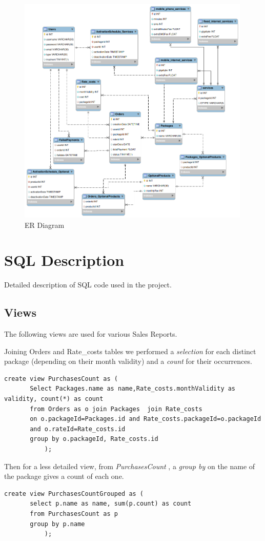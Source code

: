 \documentclass{article}
\begin{document}
\begin{figure}[hbt!]
\centering
\includegraphics[width=0.99\textwidth]{er2.png}
\caption{ER Diagram}
\end{figure}

\newpage
\section{SQL Description}

Detailed description of SQL code used in the project.
\subsection{Views}
\label{views}
The following views are used for various Sales Reports.



Joining Orders and Rate_costs tables we performed a \emph{selection} for each distinct package (depending on their month validity) and a \emph{count} for their occurrences.
\begin{lstlisting}
create view PurchasesCount as (
       Select Packages.name as name,Rate_costs.monthValidity as validity, count(*) as count
       from Orders as o join Packages  join Rate_costs
       on o.packageId=Packages.id and Rate_costs.packageId=o.packageId 
       and o.rateId=Rate_costs.id
       group by o.packageId, Rate_costs.id
           );
\end{lstlisting}
Then for a less detailed view, from \emph{PurchasesCount} , a \emph{group by} on the name of the package gives a count of each one.
\begin{lstlisting}
create view PurchasesCountGrouped as (
       select p.name as name, sum(p.count) as count
       from PurchasesCount as p
       group by p.name
           );

\end{lstlisting}
\end{document}
